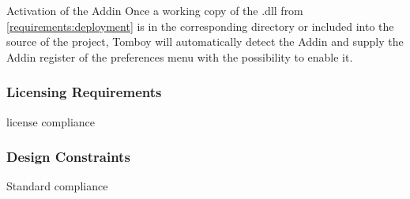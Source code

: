     \begin{requirement}{Activation of the Addin}
      \label{requirements:deployment:activation}
      Once a working copy of the .dll from \ref{requirements:deployment} is in the corresponding directory or included into the source of the project, Tomboy will automatically detect the Addin and supply the Addin register of the preferences menu with the possibility to enable it.
    \end{requirement}

    \subsubsection{Licensing Requirements}
    \label{requirements:license}
    \begin{requirement}{license compliance}
      \label{requirements:license:compliance}
    \end{requirement}


    \subsubsection{Design Constraints}
    \label{requirements:constraints}
    \begin{requirement}{Standard compliance}
      \label{requirements:constraints:standards}
    \end{requirement}


    \label{requirements:nonfunctional_end}
